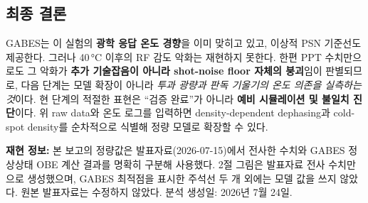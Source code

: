 \documentclass[10pt,a4paper]{article}
\begin{document}
\subsection*{최종 결론}

GABES는 이 실험의 \textbf{광학 응답 온도 경향}을 이미 맞히고 있고, 이상적 PSN 기준선도 제공한다.
그러나 40\,°C 이후의 RF 감도 악화는 재현하지 못한다. 한편 PPT 수치만으로도 그 악화가
\textbf{추가 기술잡음이 아니라 shot-noise floor 자체의 붕괴}임이 판별되므로, 다음 단계는 모델 확장이
아니라 \emph{투과 광량과 판독 기울기의 온도 의존을 실측하는 것}이다. 현 단계의 적절한 표현은
``검증 완료''가 아니라 \textbf{예비 시뮬레이션 및 불일치 진단}이다. 위 raw data와 온도 로그를 입력하면
density-dependent dephasing과 cold-spot density를 순차적으로 식별해 정량 모델로 확장할 수 있다.

\vfill
{\footnotesize
\textbf{재현 정보:} 본 보고의 정량값은 발표자료(2026-07-15)에서 전사한 수치와 GABES 정상상태
OBE 계산 결과를 명확히 구분해 사용했다. 2절 그림은 발표자료 전사 수치만으로 생성했으며, GABES
최적점을 표시한 주석선 두 개 외에는 모델 값을 쓰지 않았다. 원본 발표자료는 수정하지 않았다.
분석 생성일: 2026년 7월 24일.}
\end{document}
